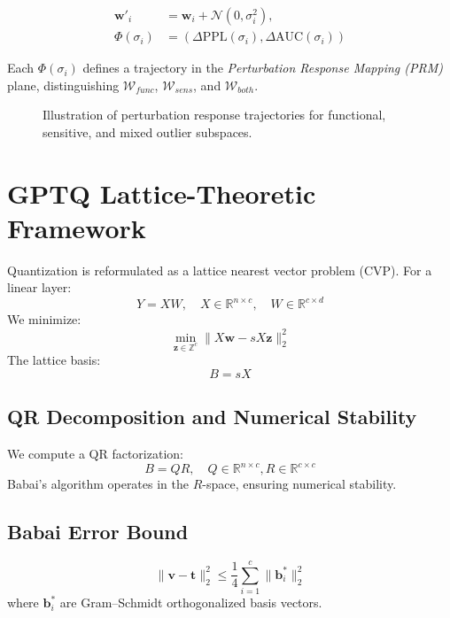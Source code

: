 \documentclass[letterpaper,twocolumn,10pt]{article}
\begin{document}
\begin{align}
\mathbf{w}'_i &= \mathbf{w}_i + \mathcal{N}(0,\sigma_i^2), \\
\Phi(\sigma_i) &= (\Delta \text{PPL}(\sigma_i), \Delta \text{AUC}(\sigma_i))
\end{align}

Each $\Phi(\sigma_i)$ defines a trajectory in the \emph{Perturbation Response Mapping (PRM)} plane, 
distinguishing $\mathcal{W}_{func}$, $\mathcal{W}_{sens}$, and $\mathcal{W}_{both}$.

\begin{figure}[h]
\centering

\caption{Illustration of perturbation response trajectories for functional, sensitive, and mixed outlier subspaces.}
\end{figure}

\section{GPTQ Lattice-Theoretic Framework}
Quantization is reformulated as a lattice nearest vector problem (CVP).  
For a linear layer:
\[
Y = XW, \quad X \in \mathbb{R}^{n\times c}, \quad W \in \mathbb{R}^{c\times d}
\]
We minimize:
\begin{equation}
\min_{\mathbf{z}\in \mathbb{Z}^c} \|X\mathbf{w} - sX\mathbf{z}\|_2^2
\end{equation}
The lattice basis:
\[
B = sX
\]

\subsection{QR Decomposition and Numerical Stability}
We compute a QR factorization:
\[
B = QR, \quad Q\in\mathbb{R}^{n\times c}, R\in\mathbb{R}^{c\times c}
\]
Babai’s algorithm operates in the $R$-space, ensuring numerical stability.

\subsection{Babai Error Bound}
\begin{equation}
\|\mathbf{v}-\mathbf{t}\|_2^2 \le \frac{1}{4}\sum_{i=1}^{c}\|\mathbf{b}^*_i\|_2^2
\end{equation}
where $\mathbf{b}_i^*$ are Gram–Schmidt orthogonalized basis vectors.
\end{document}
